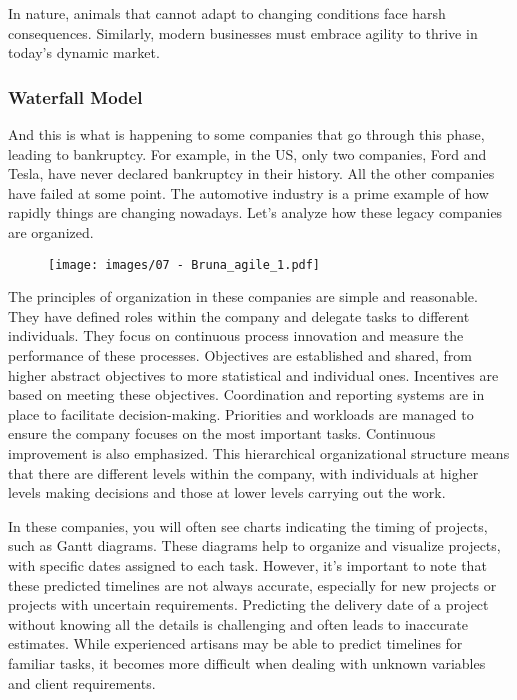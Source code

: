 In nature, animals that cannot adapt to changing conditions face harsh
consequences. Similarly, modern businesses must embrace agility to
thrive in today's dynamic market.

\subsubsection{Waterfall Model}

And this is what is happening to some companies that go through this
phase, leading to bankruptcy. For example, in the US, only two
companies, Ford and Tesla, have never declared bankruptcy in their
history. All the other companies have failed at some point. The
automotive industry is a prime example of how rapidly things are
changing nowadays. Let's analyze how these legacy companies are
organized.

\begin{figure}[!h]
  \centering
  \texttt{[image: images/07 - Bruna\_agile\_1.pdf]}
\end{figure}

The principles of organization in these companies are simple and
reasonable. They have defined roles within the company and delegate
tasks to different individuals. They focus on continuous process
innovation and measure the performance of these processes. Objectives
are established and shared, from higher abstract objectives to more
statistical and individual ones. Incentives are based on meeting these
objectives. Coordination and reporting systems are in place to
facilitate decision-making. Priorities and workloads are managed to
ensure the company focuses on the most important tasks. Continuous
improvement is also emphasized. This hierarchical organizational
structure means that there are different levels within the company, with
individuals at higher levels making decisions and those at lower levels
carrying out the work.

In these companies, you will often see charts indicating the timing of
projects, such as Gantt diagrams. These diagrams help to organize and
visualize projects, with specific dates assigned to each task. However,
it's important to note that these predicted timelines are not always
accurate, especially for new projects or projects with uncertain
requirements. Predicting the delivery date of a project without knowing
all the details is challenging and often leads to inaccurate estimates.
While experienced artisans may be able to predict timelines for familiar
tasks, it becomes more difficult when dealing with unknown variables and
client requirements.

